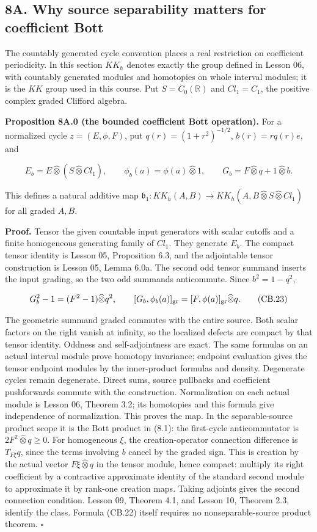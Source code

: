 \documentclass[
  11pt,
]{article}
\begin{document}
\subsection{8A. Why source separability matters for coefficient
Bott}\label{a.-why-source-separability-matters-for-coefficient-bott}

The countably generated cycle convention places a real restriction on
coefficient periodicity. In this section \(KK_h\) denotes exactly the
group defined in Lesson 06, with countably generated modules and
homotopies on whole interval modules; it is the \(KK\) group used in
this course. Put \(S=C_0(\mathbb R)\) and \(Cl_1=C_1\), the positive
complex graded Clifford algebra.

\textbf{Proposition 8A.0 (the bounded coefficient Bott operation).} For
a normalized cycle \(z=(E,\phi,F)\), put \(q(r)=(1+r^2)^{-1/2}\),
\(b(r)=rq(r)e\), and

\[
 E_b=E\widehat\otimes(S\widehat\otimes Cl_1),\qquad
 \phi_b(a)=\phi(a)\widehat\otimes1,\qquad
 G_b=F\widehat\otimes q+1\widehat\otimes b.
 \tag{CB.22}
\]

This defines a natural additive map
\(\mathfrak b_1:KK_h(A,B)\to KK_h(A,B\widehat\otimes S\widehat\otimes Cl_1)\)
for all graded \(A,B\).

\textbf{Proof.} Tensor the given countable input generators with scalar
cutoffs and a finite homogeneous generating family of \(Cl_1\). They
generate \(E_b\). The compact tensor identity is Lesson 05, Proposition
6.3, and the adjointable tensor construction is Lesson 05, Lemma 6.0a.
The second odd tensor summand inserts the input grading, so the two odd
summands anticommute. Since \(b^2=1-q^2\),

\[
 G_b^2-1=(F^2-1)\widehat\otimes q^2,\qquad
 [G_b,\phi_b(a)]_{\rm gr}=[F,\phi(a)]_{\rm gr}\widehat\otimes q.
 \tag{CB.23}
\]

The geometric summand graded commutes with the entire source. Both
scalar factors on the right vanish at infinity, so the localized defects
are compact by that tensor identity. Oddness and self-adjointness are
exact. The same formulas on an actual interval module prove homotopy
invariance; endpoint evaluation gives the tensor endpoint modules by the
inner-product formulas and density. Degenerate cycles remain degenerate.
Direct sums, source pullbacks and coefficient pushforwards commute with
the construction. Normalization on each actual module is Lesson 06,
Theorem 3.2; its homotopies and this formula give independence of
normalization. This proves the map. In the separable-source product
scope it is the Bott product in (8.1): the first-cycle anticommutator is
\(2F^2\widehat\otimes q\geq0\). For homogeneous \(\xi\), the
creation-operator connection difference is \(T_{F\xi}q\), since the
terms involving \(b\) cancel by the graded sign. This is creation by the
actual vector \(F\xi\widehat\otimes q\) in the tensor module, hence
compact: multiply its right coefficient by a contractive approximate
identity of the standard second module to approximate it by rank-one
creation maps. Taking adjoints gives the second connection condition.
Lesson 09, Theorem 4.1, and Lesson 10, Theorem 2.3, identify the class.
Formula (CB.22) itself requires no nonseparable-source product theorem.
\(\square\)
\end{document}
